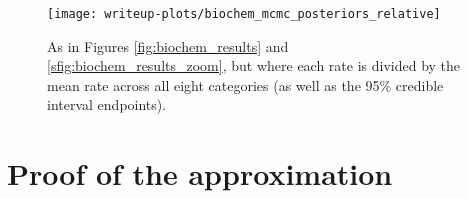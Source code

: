 \documentclass{article}
\theoremstyle{plain}
\theoremstyle{definition}
\begin{document}
\begin{figure}
    \begin{center}
        \texttt{[image: writeup-plots/biochem\_mcmc\_posteriors\_relative]}
    \end{center}
    \caption{
        As in Figures \ref{fig:biochem_results} and \ref{sfig:biochem_results_zoom},
        but where each rate is divided by the mean rate across all eight categories
        (as well as the 95\% credible interval endpoints).
        \label{sfig:biochem_results_relative}}
\end{figure}


\section{Proof of the approximation}
\label{ss:approx_pf}
\end{document}
